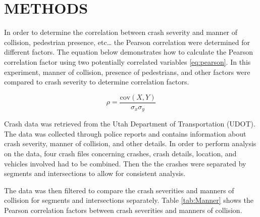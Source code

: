 \documentclass[3p, authoryear]{elsarticle} %
\begin{document}
\hypertarget{methods}{%
\section{METHODS}\label{methods}}

In order to determine the correlation between crash severity and manner of collision, pedestrian presence, etc\ldots{}
the Pearson correlation were determined for different factors. The
equation below demonstrates how to calculate the Pearson correlation factor
using two potentially correlated variables \eqref{eq:pearson}. In this experiment,
manner of collision, presence of pedestrians, and other factors were compared to crash severity to determine correlation factors.

\begin{equation}
  \rho = \frac{\text{cov}(X,Y)}{\sigma_x \sigma_y}
  \label{eq:pearson}
\end{equation}

Crash data was retrieved from the Utah Department of Transportation (UDOT). The data was collected through police reports and contains information about crash severity, manner of collision, and other details. In order to perform analysis on the data, four crash files concerning crashes, crash details, location, and vehicles involved had to be combined. Then the the crashes were separated by segments and intersections to allow for consistent analysis.

The data was then filtered to compare the crash severities and manners of collision for segments and intersections separately.
Table \ref{tab:Manner} shows the Pearson correlation factors between crash severities and manners of collision.
\end{document}
